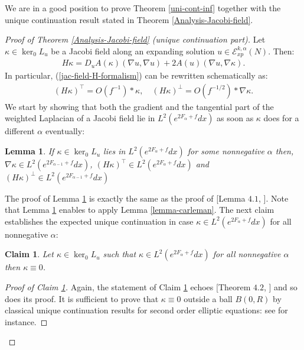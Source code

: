 \documentclass[a4paper,11pt,reqno]{amsart}
\newtheorem{lemma}[defn]{Lemma}
\newtheorem{claim}{Claim}
\newcommand{\Ent}{\mathcal{E}}
\begin{document}
We are in a good position to prove Theorem \ref{uni-cont-inf} together with the unique continuation result stated in Theorem \ref{Analysis-Jacobi-field}.

\begin{proof}[Proof of Theorem \ref{Analysis-Jacobi-field} (unique continuation part)]
 Let $\kappa \in \ker_0L_u$ be a Jacobi field along an expanding solution $u\in\Ent_{xp}^{k,\alpha}(N)$. Then:
\begin{eqnarray}
H\kappa=D_uA(\kappa)(\nabla u,\nabla u)+2A(u)(\nabla u,\nabla \kappa).\label{jac-field-H-formalism}
\end{eqnarray}
 In particular, (\ref{jac-field-H-formalism}) can be rewritten schematically as:
 \begin{eqnarray}
(H\kappa)^{\top}=\textit{O}(f^{-1})\ast \kappa,\quad (H\kappa)^{\perp}=\textit{O}(f^{-1/2})\ast\nabla\kappa.\label{system-project-jac-equ}
\end{eqnarray}
We start by showing that both the gradient and the tangential part of the weighted Laplacian of a Jacobi field lie in $L^2\left(e^{2F_{\alpha}+f}dx\right)$ as soon as $\kappa$ does for a different $\alpha$ eventually:
\begin{lemma}\label{weighted-grad-lap-L^2-lemma}
If $\kappa \in \ker_0L_u$ lies in $L^2\left(e^{2F_{\alpha}+f}dx\right)$ for some nonnegative $\alpha$ then, $\nabla \kappa\in L^2\left(e^{2F_{\alpha-1}+f}dx\right)$, $(H\kappa)^{\top}\in L^2\left(e^{2F_{\alpha}+f}dx\right)$ and $(H\kappa)^{\perp}\in L^2\left(e^{2F_{\alpha-1}+f}dx\right)$
\end{lemma}
The proof of Lemma \ref{weighted-grad-lap-L^2-lemma} is exactly the same as the proof of [Lemma $4.1$, \cite{Uni-Con-Egs-Der}]. Note that Lemma \ref{weighted-grad-lap-L^2-lemma} enables to apply Lemma \ref{lemma-carleman}.
The next claim establishes the expected unique continuation in case $\kappa\in L^2\left(e^{2F_{\alpha}+f}dx\right)$ for all nonnegative $\alpha$:
\begin{claim}\label{Unique-cont-jac-field-claim}
Let $\kappa\in \ker_0L_u$ such that $\kappa\in L^2\left(e^{2F_{\alpha}+f}dx\right)$ for all nonnegative $\alpha$ then $\kappa\equiv 0$.
\end{claim}
\begin{proof}[Proof of Claim \ref{Unique-cont-jac-field-claim}]
Again, the statement of Claim \ref{Unique-cont-jac-field-claim} echoes [Theorem $4.2$, \cite{Uni-Con-Egs-Der}] and so does its proof. It is sufficient to prove that $\kappa\equiv 0$ outside a ball $B(0,R)$ by classical unique continuation results for second order elliptic equations: see \cite{Aron-Uni-Con} for instance.


\end{proof}
\end{proof}
\end{document}
